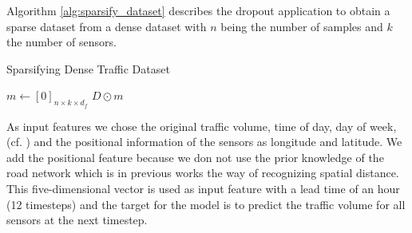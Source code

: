 Algorithm \ref{alg:sparsify_dataset} describes the dropout application to obtain a sparse dataset from a dense dataset with $n$ being the number of samples and $k$ the number of sensors.

\begin{algorithm}[!h]
\caption{Sparsifying Dense Traffic Dataset}
\label{alg:sparsify_dataset}
    \nonl\hrulefill
    
    $m \gets \left[ 0 \right]_{n \times k \times d_f}$       
    \Return $D \odot m$         
\end{algorithm}

As input features we chose the original traffic volume, time of day, day of week, (cf. \cite{Li2021}) and the positional information of the sensors as longitude and latitude.
We add the positional feature because we don not use the prior knowledge of the road network which is in previous works the way of recognizing spatial distance.
This five-dimensional vector is used as input feature with a lead time of an hour (12 timesteps) and the target for the model is to predict the traffic volume for all sensors at the next timestep.

\newcommand{\res}[2]{\small{$#1 \pm #2$}}
\newcommand{\head}[1]{\multicolumn{1}{c}{#1}}

